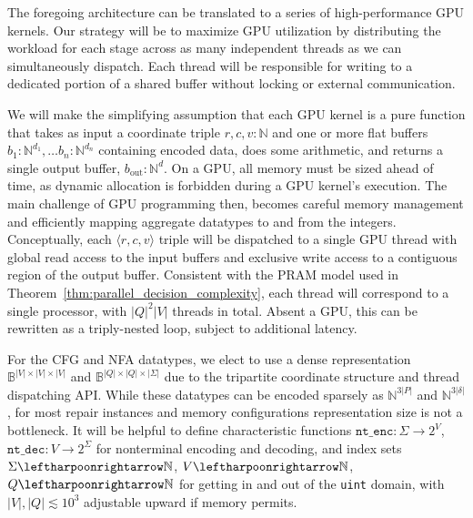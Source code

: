 \documentclass[sigplan,acmsmall,nonacm,screen]{acmart}\settopmatter{printfolios=false,printccs=false,printacmref=false}
\begin{document}
The foregoing architecture can be translated to a series of high-performance GPU kernels. Our strategy will be to maximize GPU utilization by distributing the workload for each stage across as many independent threads as we can simultaneously dispatch. Each thread will be responsible for writing to a dedicated portion of a shared buffer without locking or external communication.

We will make the simplifying assumption that each GPU kernel is a pure function that takes as input a coordinate triple $r, c, v: \mathbb{N}$ and one or more flat buffers $b_1: \mathbb{N}^{d_1}, \ldots b_n: \mathbb{N}^{d_n}$ containing encoded data, does some arithmetic, and returns a single output buffer, $b_{\text{out}}: \mathbb{N}^{d}$. On a GPU, all memory must be sized ahead of time, as dynamic allocation is forbidden during a GPU kernel's execution. The main challenge of GPU programming then, becomes careful memory management and efficiently mapping aggregate datatypes to and from the integers. Conceptually, each $\langle r, c, v\rangle$ triple will be dispatched to a single GPU thread with global read access to the input buffers and exclusive write access to a contiguous region of the output buffer. Consistent with the PRAM model used in Theorem~\ref{thm:parallel_decision_complexity}, each thread will correspond to a single processor, with $|Q|^2|V|$ threads in total. Absent a GPU, this can be rewritten as a triply-nested loop, subject to additional latency.

For the CFG and NFA datatypes, we elect to use a dense representation $\mathbb{B}^{|V|\times|V|\times|V|}$ and $\mathbb{B}^{|Q|\times|Q|\times |\Sigma|}$ due to the tripartite coordinate structure and thread dispatching API. While these datatypes can be encoded sparsely as $\mathbb{N}^{3|P|}$ and $\mathbb{N}^{3|\delta|}$, for most repair instances and memory configurations representation size is not a bottleneck. It will be helpful to define characteristic functions $\texttt{nt\_enc}: \Sigma \rightarrow 2^V$, $\texttt{nt\_dec}: V \rightarrow 2^\Sigma$ for nonterminal encoding and decoding, and index sets $\Sigma \leftharpoonrightarrow \mathbb{N}$, $V \leftharpoonrightarrow \mathbb{N}$, $Q \leftharpoonrightarrow \mathbb{N}$ for getting in and out of the \texttt{uint} domain, with $|V|, |Q| \lesssim 10^3$ adjustable upward if memory permits.
\end{document}
